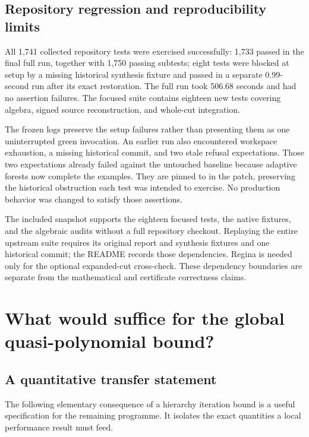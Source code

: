 \documentclass[11pt,a4paper]{article}
\theoremstyle{definition}
\theoremstyle{remark}
\newcommand{\code}[1]{\texttt{\small\detokenize{#1}}}
\begin{document}
\subsection{Repository regression and reproducibility limits}

All 1,741 collected repository tests were exercised successfully: 1,733
passed in the final full run, together with 1,750 passing subtests; eight
tests were blocked at setup by a missing historical synthesis fixture and
passed in a separate 0.99-second run after its exact restoration. The full
run took 506.68 seconds and had no assertion failures. The focused suite
contains eighteen new tests covering algebra, signed source reconstruction,
and whole-cut integration.

The frozen logs preserve the setup failures rather than presenting them
as one uninterrupted green invocation. An earlier run also encountered
workspace exhaustion, a missing historical commit, and two stale refusal
expectations. Those two expectations already failed against the untouched
baseline because adaptive forests now complete the examples. They are
pinned to \code{lower_forest='source'} in the patch, preserving the
historical obstruction each test was intended to exercise. No production
behavior was changed to satisfy those assertions.

The included snapshot supports the eighteen focused tests, the native
fixtures, and the algebraic audits without a full repository checkout.
Replaying the entire upstream suite requires its original report and
synthesis fixtures and one historical commit; the README records those
dependencies. Regina is needed only for the optional expanded-cut
cross-check. These dependency boundaries are separate from the mathematical
and certificate correctness claims.

\section{What would suffice for the global quasi-polynomial bound?}
\label{sec:global}

\subsection{A quantitative transfer statement}

The following elementary consequence of a hierarchy iteration bound is a
useful specification for the remaining programme. It isolates the exact
quantities a local performance result must feed.
\end{document}
